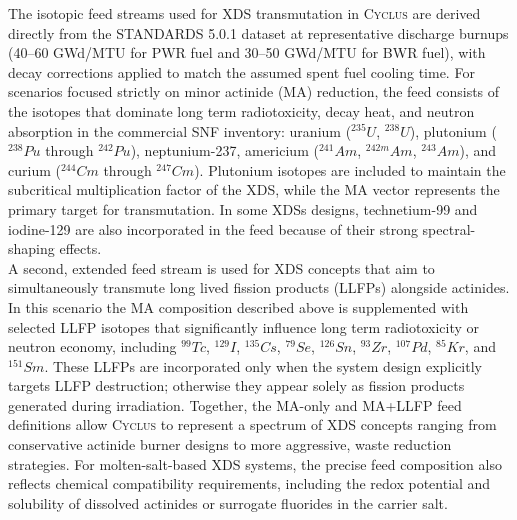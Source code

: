     The isotopic feed streams used for \gls{XDS} transmutation in \textsc{Cyclus} are derived directly from the STANDARDS 5.0.1 dataset at representative discharge burnups
    (40–60 GWd/MTU for \gls{PWR} fuel and 30–50 GWd/MTU for \gls{BWR} fuel), with decay corrections applied to match the assumed spent fuel cooling time.
    For scenarios focused strictly on minor actinide (MA) reduction, the feed consists of the isotopes that dominate long term radiotoxicity, decay heat,
    and neutron absorption in the commercial \gls{SNF} inventory: uranium ($^{235}U$, $^{238}U$), plutonium ($^{238}Pu$ through $^{242}Pu$), neptunium-237,
    americium ($^{241}Am$, $^{242m}Am$, $^{243}Am$), and curium ($^{244}Cm$ through $^{247}Cm$). Plutonium isotopes are included to maintain the subcritical multiplication
    factor of the \gls{XDS}, while the MA 
    vector represents the primary target for transmutation. In some \gls{XDS}s designs, technetium-99 and iodine-129 are
    also incorporated in the feed because of their strong spectral-shaping effects.~\cite{gohar_ads_2021}\\

    A second, extended feed stream is used for \gls{XDS} concepts that aim to simultaneously transmute long lived fission products (LLFPs) alongside actinides.
    In this scenario the MA 
    composition described above is supplemented with selected LLFP 
    isotopes that significantly influence long term radiotoxicity or
    neutron economy, including $^{99}Tc$, $^{129}I$, $^{135}Cs$, $^{79}Se$, $^{126}Sn$, $^{93}Zr$, $^{107}Pd$, $^{85}Kr$, and $^{151}Sm$.
    These LLFPs are incorporated only when the system design explicitly targets LLFP 
    destruction;
    otherwise they appear solely as fission products generated during irradiation.
    Together, the MA-only and MA+LLFP feed definitions allow \textsc{Cyclus} to represent a spectrum of \gls{XDS} concepts ranging from conservative
    actinide burner designs to more aggressive, waste reduction strategies. For molten-salt-based \gls{XDS} systems,
    the precise feed composition also reflects chemical compatibility requirements,
    including the redox potential and solubility of dissolved actinides or surrogate fluorides in the carrier salt.~\cite{herrera-martinez_transmutation_2007}\\

